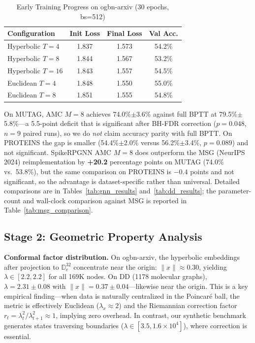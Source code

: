 \documentclass[a4paper,fleqn]{cas-dc}
\begin{document}
\begin{table}[htbp]
\caption{Early Training Progress on ogbn-arxiv (30 epochs, bs=512)}
\label{tab:convergence}
\centering\footnotesize
\begin{tabular}{@{}lccc@{}}
\toprule
\textbf{Configuration} & \textbf{Init Loss} & \textbf{Final Loss} & \textbf{Val Acc.} \\
\midrule
Hyperbolic $T{=}4$  & 1.837 & 1.573 & 54.2\% \\
Hyperbolic $T{=}8$  & 1.844 & 1.567 & 53.2\% \\
Hyperbolic $T{=}16$ & 1.843 & 1.557 & 54.5\% \\
Euclidean $T{=}4$   & 1.848 & 1.550 & 55.0\% \\
Euclidean $T{=}8$   & 1.851 & 1.555 & 54.8\% \\
\bottomrule
\end{tabular}
\end{table}

On MUTAG, AMC $M{=}8$ achieves 74.0\%$\pm$3.6\% against full BPTT at 79.5\%$\pm$5.8\%---a 5.5-point deficit that is significant after BH-FDR correction ($p{=}0.048$, $n{=}9$ paired runs), so we do \emph{not} claim accuracy parity with full BPTT. On PROTEINS the gap is smaller (54.4\%$\pm$2.0\% versus 56.2\%$\pm$3.4\%, $p{=}0.089$) and not significant. SpikeRPGNN AMC $M{=}8$ does outperform the MSG (NeurIPS 2024) reimplementation by \textbf{+20.2} percentage points on MUTAG (74.0\% vs.\ 53.8\%), but the same comparison on PROTEINS is $-0.4$ points and not significant, so the advantage is dataset-specific rather than universal. Detailed comparisons are in Tables~\ref{tab:gnn_results} and~\ref{tab:dd_results}; the parameter-count and wall-clock comparison against MSG is reported in Table~\ref{tab:msg_comparison}.

\subsection{Stage 2: Geometric Property Analysis}

\textbf{Conformal factor distribution.} On ogbn-arxiv, the hyperbolic embeddings after projection to $\mathbb{D}^{32}_c$ concentrate near the origin: $\|x\| \approx 0.30$, yielding $\lambda \in [2.2, 2.2]$ for all 169K nodes. On DD (1178 molecular graphs), $\lambda = 2.31 \pm 0.08$ with $\|x\| = 0.37 \pm 0.04$---likewise near the origin. This is a key empirical finding---when data is naturally centralized in the Poincar\'e ball, the metric is effectively Euclidean ($\lambda_x \approx 2$) and the Riemannian correction factor $r_t = \lambda_t^2/\lambda_{t+1}^2 \approx 1$, implying zero overhead. In contrast, our synthetic benchmark generates states traversing boundaries ($\lambda \in [3.5, 1.6{\times}10^4]$), where correction is essential.
\end{document}
